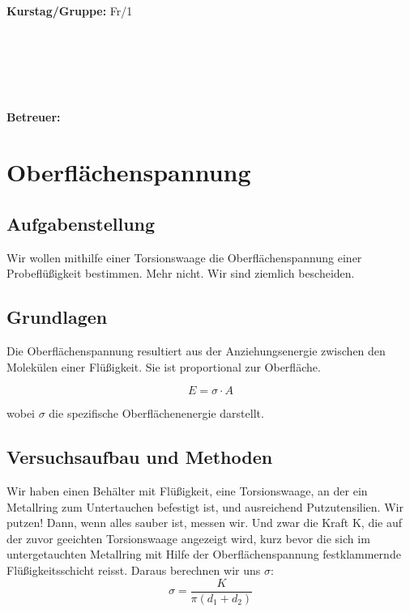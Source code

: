 \documentclass{article}
\begin{document}
\begin{verbatim}


\end{verbatim}
			\begin{flushleft}
			\textbf{\Large{Kurstag/Gruppe:}} \Large{Fr/1}
			\end{flushleft}

\begin{verbatim}






\end{verbatim}
			\begin{flushleft}
			\LARGE{\textbf{Betreuer:}}	\Large{}	
			\end{flushleft}
\newpage
\section{Oberflächenspannung}
\subsection{Aufgabenstellung}
Wir wollen mithilfe einer Torsionswaage die Oberflächenspannung einer Probeflüßigkeit bestimmen. Mehr nicht. Wir sind ziemlich bescheiden.
\subsection{Grundlagen}
Die Oberflächenspannung resultiert aus der Anziehungsenergie zwischen den Molekülen einer Flüßigkeit. Sie ist proportional zur Oberfläche.

\begin{equation} 
E=\sigma \cdot A
\end{equation}

wobei $\sigma$ die spezifische Oberflächenenergie darstellt.
\subsection{Versuchsaufbau und Methoden}
Wir haben einen Behälter mit Flüßigkeit, eine Torsionswaage, an der ein Metallring zum Untertauchen befestigt ist, und ausreichend Putzutensilien. Wir putzen! Dann, wenn alles sauber ist, messen wir. Und zwar die Kraft K, die auf der zuvor geeichten Torsionswaage angezeigt wird, kurz bevor die sich im untergetauchten Metallring mit Hilfe der Oberflächenspannung festklammernde Flüßigkeitsschicht reisst. Daraus berechnen wir uns $\sigma$:
\begin{equation}
\sigma=\frac{K}{\pi(d_1+d_2)}
\end{equation}
\end{document}
